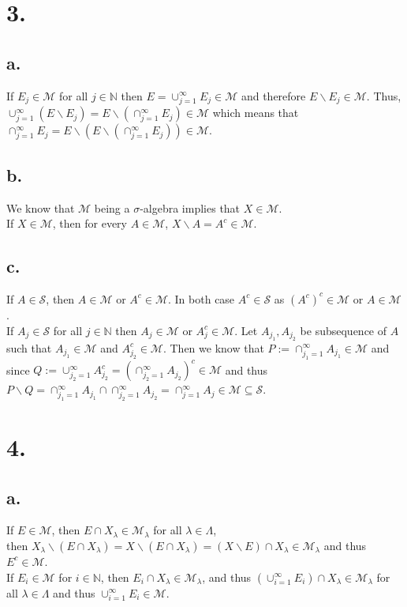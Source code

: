 \documentclass[11pt]{article}
\theoremstyle{mystyle}
\theoremstyle{definition}
\begin{document}
\section*{3.}
\subsection*{a.}
If $E_j \in \mathcal{M}$ for all $j \in \mathbb{N}$ then $E = \cup_{j=1}^\infty E_j \in \mathcal{M}$ and therefore $E \backslash E_j \in \mathcal{M}$. Thus, $\cup_{j=1}^\infty (E \backslash E_j) = E \backslash (\cap_{j=1}^\infty E_j) \in \mathcal{M}$ which means that $\cap_{j=1}^\infty E_j = E \backslash (E \backslash (\cap_{j=1}^\infty E_j)) \in \mathcal{M}$. 
\subsection*{b.}
We know that $\mathcal{M}$ being a $\sigma$-algebra implies that $X \in \mathcal{M}$. \\
If $X \in \mathcal{M}$, then for every $A \in \mathcal{M}$, $X \backslash A = A^c \in \mathcal{M}$. 
\subsection*{c.}
If $A \in \mathcal{S}$, then $A \in \mathcal{M}$ or $A^c \in \mathcal{M}$. In both case $A^c \in \mathcal{S}$ as $(A^c)^c \in \mathcal{M}$ or $A \in \mathcal{M}$. \\
If $A_j \in \mathcal{S}$ for all $j \in \mathbb{N}$ then $A_j \in \mathcal{M}$ or $A_j^c \in \mathcal{M}$. Let $A_{j_1}, A_{j_2}$ be subsequence of $A$ such that $A_{j_1} \in \mathcal{M}$ and $A_{j_2}^c \in \mathcal{M}$. Then we know that $P:= \cap_{j_1 = 1}^\infty A_{j_1} \in \mathcal{M}$ and since $Q := \cup_{j_2=1}^\infty A_{j_2}^c = (\cap_{j_2=1}^\infty A_{j_2})^c \in \mathcal{M}$ and thus $P\backslash Q = \cap_{j_1=1}^\infty A_{j_1} \cap \cap_{j_2=1}^\infty A_{j_2} = \cap_{j=1}^\infty A_j \in \mathcal{M} \subseteq \mathcal{S}$. 
\newpage
\section*{4.}
\subsection*{a.}
If $E \in \mathcal{M}$, then $E \cap X_\lambda \in \mathcal{M}_\lambda$ for all $\lambda \in \Lambda$, \\
then $X_\lambda \backslash (E \cap X_\lambda) = X\backslash (E \cap X_\lambda) = (X\backslash E)\cap X_\lambda  \in \mathcal{M}_\lambda$ and thus $E^c \in \mathcal{M}$. \\ 
If $E_i \in \mathcal{M}$ for $i \in \mathbb{N}$, then $E_i \cap X_\lambda \in \mathcal{M}_\lambda$, and thus $(\cup_{i=1}^\infty E_i )\cap X_\lambda \in \mathcal{M}_\lambda$ for all $\lambda \in \Lambda$ and thus $\cup_{i=1}^\infty E_i \in \mathcal{M}$. 
\end{document}

